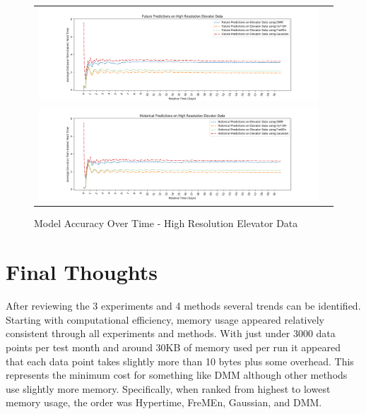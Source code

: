 \begin{center}
\begin{figure}[!Hp]
  \begin{tabular}{cc}
    {\includegraphics[width = 6in]{images/results/Future_Predictions_on_High_Resolution_Elevator_Data.png}} \\
    {\includegraphics[width = 6in]{images/results/Historical_Predictions_on_High_Resolution_Elevator_Data.png}} \\
  \end{tabular}
  \caption{Model Accuracy Over Time - High Resolution Elevator Data}
  \label{figure:Model_Accuracy_Over_Time_-_High_Resolution_Elevator_Data}
\end{figure}
\end{center}


\section{ Final Thoughts }

After reviewing the 3 experiments and 4 methods several trends can be
identified. Starting with computational efficiency, memory usage appeared
relatively consistent through all experiments and methods. With just under 3000
data points per test month and around 30KB of memory used per run
it appeared that each data point takes slightly more than 10 bytes plus
some overhead. This represents the minimum cost for something like DMM although
other methods use slightly more memory. Specifically, when ranked from highest to lowest memory usage,
the order was Hypertime, FreMEn, Gaussian, and DMM. \\

